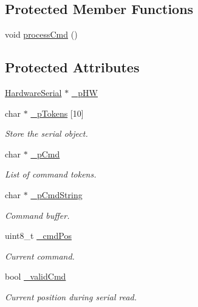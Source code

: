 \subsection*{Protected Member Functions}
\begin{DoxyCompactItemize}
\item 
void \hyperlink{class_cmd_processor_a56ce7cebb2a72262ba0d1ba0937739d5}{processCmd} ()
\end{DoxyCompactItemize}
\subsection*{Protected Attributes}
\begin{DoxyCompactItemize}
\item 
\hyperlink{class_hardware_serial}{HardwareSerial} $\ast$ \hyperlink{class_cmd_processor_a8df6f12b27223c1f1876ea7221cd2413}{\_\-pHW}
\item 
char $\ast$ \hyperlink{class_cmd_processor_a2b857367533cd33ba9a68746c71c5e3d}{\_\-pTokens} \mbox{[}10\mbox{]}
\begin{DoxyCompactList}\small\item\em Store the serial object. \item\end{DoxyCompactList}\item 
char $\ast$ \hyperlink{class_cmd_processor_a2017c885b275984549385ba246ec37f5}{\_\-pCmd}
\begin{DoxyCompactList}\small\item\em List of command tokens. \item\end{DoxyCompactList}\item 
char $\ast$ \hyperlink{class_cmd_processor_acc77d1f9a20e535e1073950001c0cc36}{\_\-pCmdString}
\begin{DoxyCompactList}\small\item\em Command buffer. \item\end{DoxyCompactList}\item 
uint8\_\-t \hyperlink{class_cmd_processor_a6201596327a378c5317c1f6a8a9d5bc4}{\_\-cmdPos}
\begin{DoxyCompactList}\small\item\em Current command. \item\end{DoxyCompactList}\item 
bool \hyperlink{class_cmd_processor_a18b0886303779762a37096d6446aefa6}{\_\-validCmd}
\begin{DoxyCompactList}\small\item\em Current position during serial read. \item\end{DoxyCompactList}\item 

\end{DoxyCompactItemize}
